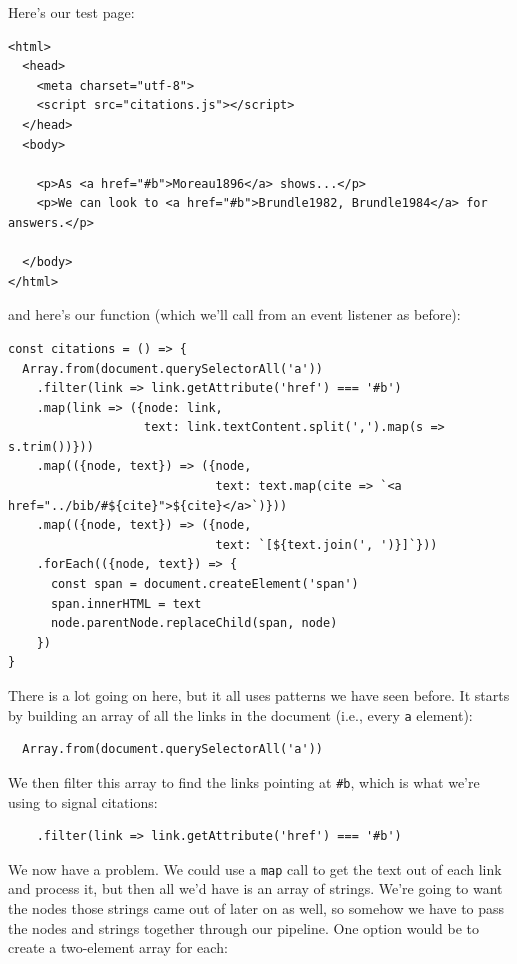Here's our test page:

\begin{verbatim}
<html>
  <head>
    <meta charset="utf-8">
    <script src="citations.js"></script>
  </head>
  <body>

    <p>As <a href="#b">Moreau1896</a> shows...</p>
    <p>We can look to <a href="#b">Brundle1982, Brundle1984</a> for answers.</p>

  </body>
</html>
\end{verbatim}

and here's our function (which we'll call from an event listener as
before):

\begin{verbatim}
const citations = () => {
  Array.from(document.querySelectorAll('a'))
    .filter(link => link.getAttribute('href') === '#b')
    .map(link => ({node: link,
                   text: link.textContent.split(',').map(s => s.trim())}))
    .map(({node, text}) => ({node,
                             text: text.map(cite => `<a href="../bib/#${cite}">${cite}</a>`)}))
    .map(({node, text}) => ({node,
                             text: `[${text.join(', ')}]`}))
    .forEach(({node, text}) => {
      const span = document.createElement('span')
      span.innerHTML = text
      node.parentNode.replaceChild(span, node)
    })
}
\end{verbatim}

There is a lot going on here, but it all uses patterns we have seen
before. It starts by building an array of all the links in the document
(i.e., every \texttt{a} element):

\begin{verbatim}
  Array.from(document.querySelectorAll('a'))
\end{verbatim}

We then filter this array to find the links pointing at \texttt{\#b},
which is what we're using to signal citations:

\begin{verbatim}
    .filter(link => link.getAttribute('href') === '#b')
\end{verbatim}

We now have a problem. We could use a \texttt{map} call to get the text
out of each link and process it, but then all we'd have is an array of
strings. We're going to want the nodes those strings came out of later
on as well, so somehow we have to pass the nodes and strings together
through our pipeline. One option would be to create a two-element array
for each:

